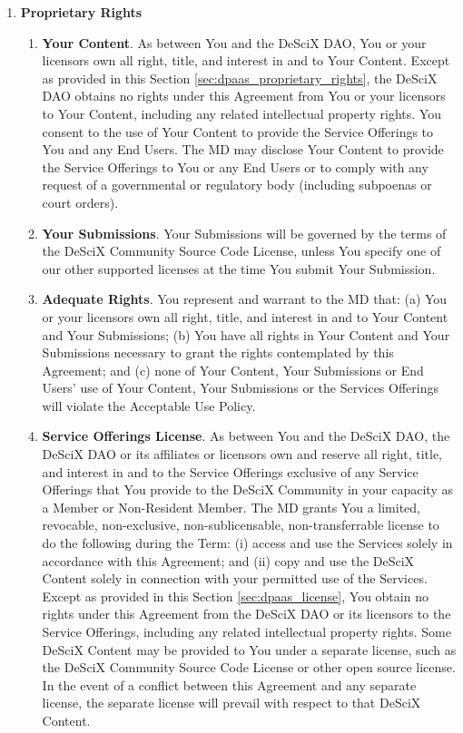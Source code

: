 \documentclass{article}
\begin{document}
\begin{enumerate}
    \item \textbf{Proprietary Rights} \label{sec:dpaas_proprietary_rights}

    \begin{enumerate}
        \item \textbf{Your Content}. As between You and the DeSciX DAO, You or your licensors own all right, title, and interest in and to Your Content. Except as provided in this Section \ref{sec:dpaas_proprietary_rights}, the DeSciX DAO obtains no rights under this Agreement from You or your licensors to Your Content, including any related intellectual property rights. You consent to the use of Your Content to provide the Service Offerings to You and any End Users. The MD may disclose Your Content to provide the Service Offerings to You or any End Users or to comply with any request of a governmental or regulatory body (including subpoenas or court orders).
        
        \item \textbf{Your Submissions}. Your Submissions will be governed by the terms of the DeSciX Community Source Code License, unless You specify one of our other supported licenses at the time You submit Your Submission.
        
        \item \textbf{Adequate Rights}. You represent and warrant to the MD that: (a) You or your licensors own all right, title, and interest in and to Your Content and Your Submissions; (b) You have all rights in Your Content and Your Submissions necessary to grant the rights contemplated by this Agreement; and (c) none of Your Content, Your Submissions or End Users’ use of Your Content, Your Submissions or the Services Offerings will violate the Acceptable Use Policy.
        
        \item \textbf{Service Offerings License}. \label{sec:dpaas_license} As between You and the DeSciX DAO, the DeSciX DAO or its affiliates or licensors own and reserve all right, title, and interest in and to the Service Offerings exclusive of any Service Offerings that You provide to the DeSciX Community in your capacity as a Member or Non-Resident Member. The MD grants You a limited, revocable, non-exclusive, non-sublicensable, non-transferrable license to do the following during the Term: (i) access and use the Services solely in accordance with this Agreement; and (ii) copy and use the DeSciX Content solely in connection with your permitted use of the Services. Except as provided in this Section \ref{sec:dpaas_license}, You obtain no rights under this Agreement from the DeSciX DAO or its licensors to the Service Offerings, including any related intellectual property rights. Some DeSciX Content may be provided to You under a separate license, such as the DeSciX Community Source Code License or other open source license. In the event of a conflict between this Agreement and any separate license, the separate license will prevail with respect to that DeSciX Content.
        

\end{enumerate}
\end{enumerate}
\end{document}
